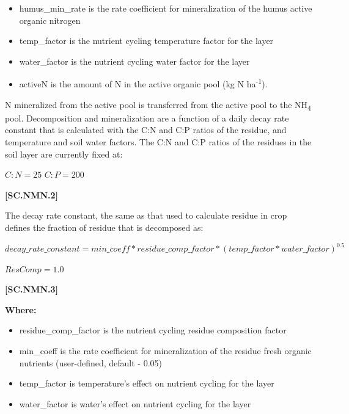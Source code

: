         \begin{itemize}
            \item humus\_min\_rate is the rate coefficient for mineralization of the humus active organic nitrogen
            \item temp\_factor is the nutrient cycling temperature factor for the layer
            \item water\_factor is the nutrient cycling water factor for the layer
            \item activeN is the amount of N in the active organic pool (kg N ha\textsuperscript{-1}).
        \end{itemize}
        \vspace{0.5cm}

N mineralized from the active pool is transferred from the active pool to the NH\textsubscript{4} pool. Decomposition and mineralization are a function of a daily decay rate constant that is calculated with the C:N and C:P ratios of the residue, and temperature and soil water factors. The C:N and C:P ratios of the residues in the soil layer are currently fixed at:
\vspace{0.5cm}
\begin{center}
\(C:N = 25\)
\(C:P = 200\)
\end{center}
 \vspace{0.5cm}
    {\raggedleft \textbf{[SC.NMN.2]}\par}
    \vspace{0.5cm}

The decay rate constant, the same as that used to calculate residue in crop defines the fraction of residue that is decomposed as: 
\vspace{0.5cm}
            
    \begin{center}
\(decay\_rate\_constant=min\_coeff * residue\_comp\_factor * (temp\_factor * water\_factor)^{0.5}\)
\vspace{0.1cm}

\(ResComp = 1.0\)

    \end{center}
        \vspace{0.5cm} 
    
            {\raggedleft \textbf{[SC.NMN.3]}\par}
            \vspace{0.5cm}

        \textbf{Where:}
            
        \begin{itemize}
            \item residue\_comp\_factor is the nutrient cycling residue composition factor
            \item min\_coeff is the rate coefficient for mineralization of the residue fresh organic nutrients (user-defined, default - 0.05)
            \item temp\_factor is temperature’s effect on nutrient cycling for the layer
            \item water\_factor is water’s effect on nutrient cycling for the layer
        \end{itemize}
        \vspace{0.5cm}
        

